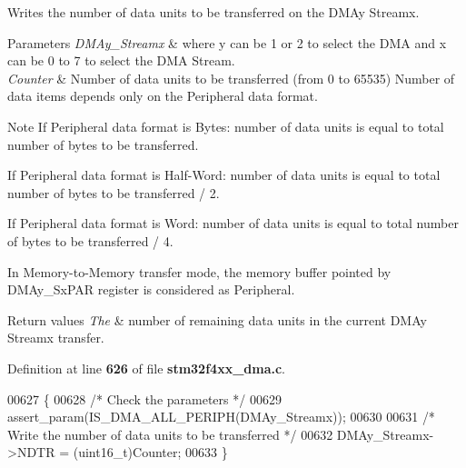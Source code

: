 Writes the number of data units to be transferred on the D\+M\+Ay Streamx. 


\begin{DoxyParams}{Parameters}
{\em D\+M\+Ay\+\_\+\+Streamx} & where y can be 1 or 2 to select the D\+MA and x can be 0 to 7 to select the D\+MA Stream. \\
\hline
{\em Counter} & Number of data units to be transferred (from 0 to 65535) Number of data items depends only on the Peripheral data format.\\
\hline
\end{DoxyParams}
\begin{DoxyNote}{Note}
If Peripheral data format is Bytes\+: number of data units is equal to total number of bytes to be transferred.

If Peripheral data format is Half-\/\+Word\+: number of data units is equal to total number of bytes to be transferred / 2.

If Peripheral data format is Word\+: number of data units is equal to total number of bytes to be transferred / 4.

In Memory-\/to-\/\+Memory transfer mode, the memory buffer pointed by D\+M\+Ay\+\_\+\+Sx\+P\+AR register is considered as Peripheral.
\end{DoxyNote}

\begin{DoxyRetVals}{Return values}
{\em The} & number of remaining data units in the current D\+M\+Ay Streamx transfer. \\
\hline
\end{DoxyRetVals}


Definition at line \textbf{ 626} of file \textbf{ stm32f4xx\+\_\+dma.\+c}.


\begin{DoxyCode}
00627 \{
00628   \textcolor{comment}{/* Check the parameters */}
00629   assert_param(IS_DMA_ALL_PERIPH(DMAy\_Streamx));
00630 
00631   \textcolor{comment}{/* Write the number of data units to be transferred */}
00632   DMAy\_Streamx->NDTR = (uint16\_t)Counter;
00633 \}
\end{DoxyCode}
